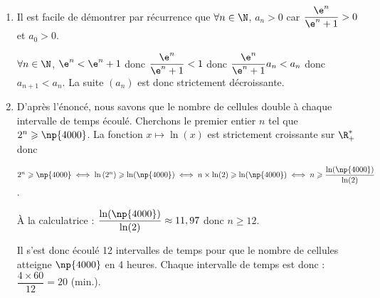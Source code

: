 \begin{enumerate}
Donc $\forall n \in \N$,  $w_n=\dfrac{w_{n+1}+4}{2}$.
	
$w_1=\dfrac{w_{2}+4}{2}=\dfrac{8+4}{2}=6$ et $w_0=\dfrac{w_{1}+4}{2}=\dfrac{6+4}{2}=5$ \hfill {}
	\item Il est facile de démontrer par récurrence que $\forall n \in \N$, $a_n > 0$ car $\dfrac{\e^n}{\e^n+1}> 0 $ et $a_0 > 0$.
	
$\forall n \in \N$, $\e^n <  \e^n+1$ donc $\dfrac{\e^n}{\e^n+1}< 1$ donc $\dfrac{\e^n}{\e^n+1} a_n< a_n$ donc $a_{n+1} < a_n$. La suite $(a_n)$ est donc strictement décroissante. \hfill {}
	
	\item D'après l'énoncé, nous savons que le nombre de cellules double à chaque intervalle de temps écoulé. Cherchons le premier entier $n$ tel que $2^n\geqslant \np{4000}$. La fonction $x\mapsto \ln(x)$ est strictement croissante sur $\R_+^*$ donc 
	
$2^n\geqslant \np{4000}\iff \ln\left(2^n\right) \geqslant \ln(\np{4000})\iff n \times \ln(2) \geqslant \ln(\np{4000}) \iff n \geqslant \dfrac{\ln(\np{4000}) }{\ln(2)}$.
	
À la calculatrice : $\dfrac{\ln(\np{4000}) }{\ln(2)}\approx 11,97$ donc $n\geqslant 12.$
	
Il s'est donc écoulé 12 intervalles de temps pour que le nombre de cellules atteigne $\np{4000}$ en 4 heures. Chaque intervalle de temps est donc : $\dfrac{4\times 60}{12}= 20$ (min.).\hfill {}
	
\end{enumerate}

\bigskip
